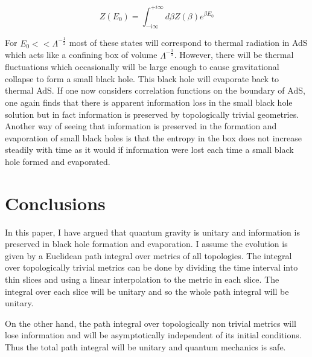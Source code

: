\documentclass[aps,prd,groupedaddress,showpacs]{revtex4}
\begin{document}
\begin{equation}
Z(E_0)=\int_{-i\infty}^{+i\infty}d\beta Z(\beta)e^{\beta E_0}
\end{equation}

For $E_0 << \Lambda^{-\frac{1}{2}}$ most of these states will correspond to thermal radiation in AdS which acts like a confining box of volume $\Lambda^{-\frac{3}{2}}$. However, there will be thermal fluctuations which occasionally will be large enough to cause gravitational collapse to form a small black hole. This black hole will evaporate back to thermal AdS. If one now considers correlation functions on the boundary of AdS, one again finds that there is apparent information loss in the small black hole solution but in fact information is preserved by topologically trivial geometries. Another way of seeing that information is preserved in the formation and evaporation of small black holes is that the entropy in the box does not increase steadily with time as it would if information were lost each time a small black hole formed and evaporated. 


\section{Conclusions}

In this paper, I have argued that quantum gravity is unitary and information is preserved in black hole formation and evaporation. I assume the evolution is given by a Euclidean path integral over metrics of all topologies. The integral over topologically trivial metrics can be done by dividing the time interval into thin slices and using a linear interpolation to the metric in each slice. The integral over each slice will be unitary and so the whole path integral will be unitary. 

On the other hand, the path integral over topologically non trivial metrics will lose information and will be asymptotically independent of its initial conditions. Thus the total path integral will be unitary and quantum mechanics is safe. 
\end{document}
